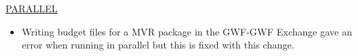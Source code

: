 




	\underline{PARALLEL}
	\begin{itemize}
		\item Writing budget files for a MVR package in the GWF-GWF Exchange gave an error when running in parallel but this is fixed with this change.
	\end{itemize}

